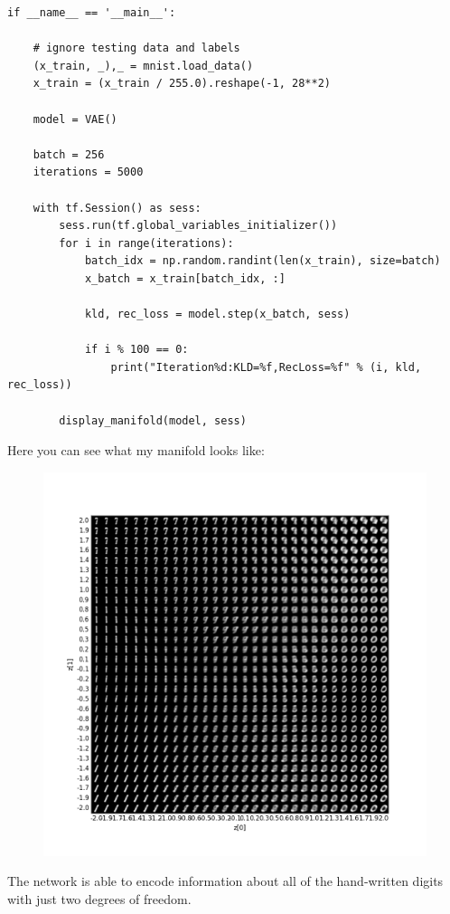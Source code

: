 \documentclass[10 pt]{article}
\begin{document}
\begin{lstlisting}
if __name__ == '__main__':
    
    # ignore testing data and labels
    (x_train, _),_ = mnist.load_data()
    x_train = (x_train / 255.0).reshape(-1, 28**2)

    model = VAE()
    
    batch = 256
    iterations = 5000

    with tf.Session() as sess:
        sess.run(tf.global_variables_initializer())
        for i in range(iterations):
            batch_idx = np.random.randint(len(x_train), size=batch)
            x_batch = x_train[batch_idx, :]
    
            kld, rec_loss = model.step(x_batch, sess)

            if i % 100 == 0:
                print("Iteration%d:KLD=%f,RecLoss=%f" % (i, kld, rec_loss))

        display_manifold(model, sess)

\end{lstlisting}
\vspace{2000pt}
Here you can see what my manifold looks like:
\begin{figure} [H]
    \includegraphics[width=\textwidth]{figs/latent}
\end{figure}

The network is able to encode information about all of the hand-written digits with just 
two degrees of freedom.


\end{document}
